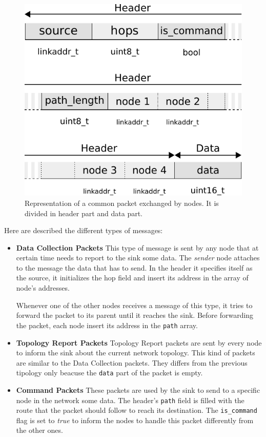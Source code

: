 \begin{figure}[t]
	\centering
	\includegraphics[width=0.8\columnwidth]{res/msg}
	\caption{Representation of a common packet exchanged by nodes. It is divided in header part and data part.}
	\label{fig:msg_packet}
\end{figure}

Here are described the different types of messages:

\begin{itemize}

\item \textbf{Data Collection Packets} This type of message is sent by any node that at certain time needs to report to the sink some data. The \textit{sender} node attaches to the message the data that has to send. In the header it specifies itself as the source, it initializes the hop field and insert its address in the array of node's addresses. 

Whenever one of the other nodes receives a message of this type, it tries to forward the packet to its parent until it reaches the sink. Before forwarding the packet, each node insert its address in the \texttt{path} array.

\item \textbf{Topology Report Packets} Topology Report packets are sent by every node to inform the sink about the current network topology. This kind of packets are similar to the Data Collection packets. They differs from the previous tipology only beacuse the \texttt{data} part of the packet is empty.

\item \textbf{Command Packets} These packets are used by the sink to send to a specific node in the network some data. The header's \texttt{path} field is filled with the route that the packet should follow to reach its destination. The \texttt{is\_command} flag is set to \textit{true} to inform the nodes to handle this packet differently from the other ones.

\end{itemize}



